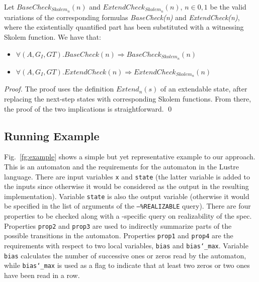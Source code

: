 \begin{theorem} Let $BaseCheck_{Skolem_n}(n)$ and
$ExtendCheck_{Skolem_n}(n)$, $n \in {0,1}$ be the valid
variations of the corresponding formulas \textit{BaseCheck(n)} and
\textit{ExtendCheck(n)}, where the existentially quantified part has been substituted
with a witnessing Skolem function. We have that:
\begin{itemize}
\item $\forall (A,G_{I},G{T}). BaseCheck(n) \Rightarrow BaseCheck_{Skolem_n}(n)$
\item $\forall (A,G_{I},G{T}). ExtendCheck(n) \Rightarrow
ExtendCheck_{Skolem_n}(n)$
\end{itemize}
\end{theorem}
\begin{proof}
The proof uses the definition \textit{$Extend_n(s)$} of an extendable state,
after replacing the next-step states with corresponding Skolem functions. From there,
the proof of the two implications is straightforward.
\qed
\end{proof}

 \subsection{Running Example} 
 
 Fig.~\ref{fg:example} shows a
 simple but yet representative example to our approach.
 This is an automaton and the requirements for the automaton in the Lustre language.
 There are input variables \texttt{x} and \texttt{state} (the latter variable is added to the inputs since
 otherwise it would be considered as the output in the resulting implementation).
 Variable \texttt{state} is also the output variable (otherwise it would be specified in the list of arguments of the \texttt{--\%REALIZABLE} query).
 There are four properties to be checked along with a
 \jkind-specific query on realizability of the spec. Properties
 \texttt{prop2} and \texttt{prop3} are used to indirectly summarize parts of the
 possible transitions in the automaton. Properties \texttt{prop1} and
 \texttt{prop4} are the requirements with respect to two local variables, \texttt{bias}
 and \texttt{bias\char`_max}. Variable \texttt{bias} calculates the number of successive
 ones or zeros read by the automaton, while \texttt{bias\char`_max} is used as a flag
 to indicate that at least two zeros or two ones have been read in a row.
 
